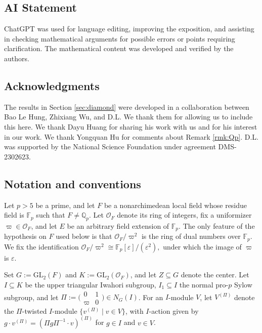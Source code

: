 \documentclass[a4paper,10pt,twoside]{amsart}
\theoremstyle{definition}
\numberwithin{equation}{section}
\begin{document}
\subsection{AI Statement}

ChatGPT was used for language editing, improving the exposition, and assisting in checking mathematical arguments for possible errors or points requiring clarification. The mathematical content was developed and verified by the authors.

\subsection{Acknowledgments}

The results in Section \ref{sec:diamond} were developed in a collaboration between Bao Le Hung, Zhixiang Wu, and D.L. 
We thank them for allowing us to include this here. 
We thank Dayu Huang for sharing his work \cite{Huang} with us and for his interest in our work. 
We thank Yongquan Hu for comments about Remark \ref{rmk:Qp}. 
D.L. was supported by the National Science Foundation under agreement DMS-2302623. 

\subsection{Notation and conventions}

Let \(p>5\) be a prime, and let \(F\) be a nonarchimedean local field whose residue field is \(\mathbb F_p\) such that \(F\neq\mathbb Q_p\). Let
\(\mathcal O_F\) denote its ring of integers, fix a uniformizer
\(\varpi\in\mathcal O_F\), and let \(E\) be an arbitrary field extension of
\(\mathbb F_p\). The only feature of the hypothesis on \(F\) used below is that
\(\mathcal O_F/\varpi^2\) is the ring of dual numbers over \(\mathbb F_p\).
We fix the identification $\mathcal O_F/\varpi^2\cong \mathbb F_p[\varepsilon]/(\varepsilon^2),
$ under which the image of \(\varpi\) is \(\varepsilon\).

Set \(G:=\mathrm{GL}_2(F)\) and \(K:=\mathrm{GL}_2(\mathcal O_F)\), and let
\(Z\subseteq G\) denote the center. Let \(I\subseteq K\) be the upper triangular Iwahori subgroup, \(I_1\subseteq I\) the normal pro-\(p\) Sylow
subgroup, and let $\Pi:=\bigl(\begin{smallmatrix} 0 & 1 \\ \varpi & 0 \end{smallmatrix}\bigr) \in N_G(I)$. For an \(I\)-module \(V\), let \(V^{(\Pi)}\) denote the \(\Pi\)-twisted \(I\)-module \(\{v^{(\Pi)}\mid v\in V\}\), with \(I\)-action given by \(g\cdot v^{(\Pi)}=(\Pi g\Pi^{-1}\cdot v)^{(\Pi)}\) for \(g\in I\) and \( v\in V\).
\end{document}
